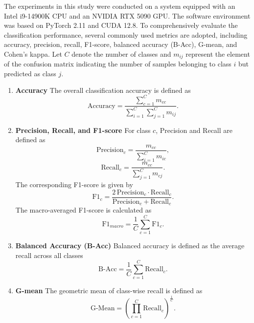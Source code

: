 \documentclass[anonymous]{iopjournal}
\begin{document}
The experiments in this study were conducted on a system equipped with an Intel i9-14900K CPU and an NVIDIA RTX 5090 GPU. The software environment was based on PyTorch 2.11 and CUDA 12.8. To comprehensively evaluate the classification performance, several commonly used metrics are adopted, including accuracy, precision, recall, F1-score, balanced accuracy (B-Acc), G-mean, and Cohen’s kappa. Let $C$ denote the number of classes and $m_{ij}$ represent the element of the confusion matrix indicating the number of samples belonging to class $i$ but predicted as class $j$.
\begin{enumerate}
	\item \textbf{Accuracy}
	The overall classification accuracy is defined as
	\begin{equation}
		\mathrm{Accuracy} =
		\frac{\sum_{c=1}^{C} m_{cc}}
		{\sum_{i=1}^{C}\sum_{j=1}^{C} m_{ij}}.
	\end{equation}
	\item \textbf{Precision, Recall, and F1-score}
	For class $c$, Precision and Recall are defined as
	\begin{equation}
		\mathrm{Precision}_c =
		\frac{m_{cc}}
		{\sum_{i=1}^{C} m_{ic}},
	\end{equation}
	\begin{equation}
		\mathrm{Recall}_c =
		\frac{m_{cc}}
		{\sum_{j=1}^{C} m_{cj}}.
	\end{equation}
	The corresponding F1-score is given by
	\begin{equation}
		\mathrm{F1}_c =
		\frac{2\,\mathrm{Precision}_c \cdot \mathrm{Recall}_c}
		{\mathrm{Precision}_c + \mathrm{Recall}_c}.
	\end{equation}
	The macro-averaged F1-score is calculated as
	\begin{equation}
		\mathrm{F1}_{macro} =
		\frac{1}{C}\sum_{c=1}^{C}\mathrm{F1}_c.
	\end{equation}
	\item \textbf{Balanced Accuracy (B-Acc)}
	Balanced accuracy is defined as the average recall across all classes
	\begin{equation}
		\mathrm{B\text{-}Acc} =
		\frac{1}{C}\sum_{c=1}^{C}\mathrm{Recall}_c.
	\end{equation}
	\item \textbf{G-mean}
	The geometric mean of class-wise recall is defined as
	\begin{equation}
		\mathrm{G\text{-}Mean} =
		\left(\prod_{c=1}^{C}\mathrm{Recall}_c\right)^{\frac{1}{C}}.
	\end{equation}

\end{enumerate}
\end{document}
